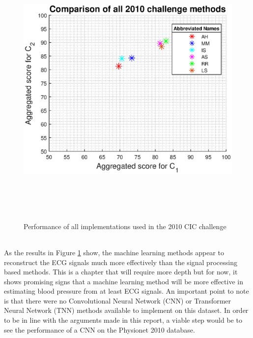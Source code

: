 \documentclass[11pt, a4paper]{article}
\begin{document}
\begin{figure}[H]
    \centering
    \includegraphics[width=14cm,height=14cm,keepaspectratio]{Figures/challenge2010.eps}
    \caption{Performance of all implementations used in the 2010 CIC challenge}
    \label{lol}
\end{figure} \\ \newline \noindent As the results in Figure \ref{lol} show, the machine learning methods appear to reconstruct the ECG signals much more effectively than the signal processing based methods. This is a chapter that will require more depth but for now, it shows promising signs that a machine learning method will be more effective in estimating blood pressure from at least ECG signals. An important point to note is that there were no Convolutional Neural Network (CNN) or Transformer Neural Network (TNN) methods available to implement on this dataset. In order to be in line with the arguments made in this report, a viable step would be to see the performance of a CNN on the Physionet 2010 database.



\newpage
\end{document}
